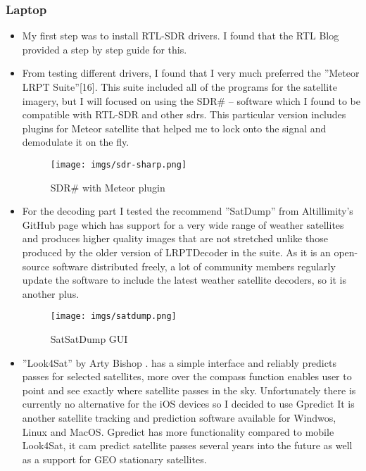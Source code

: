 \documentclass{article}
\begin{document}
        \subsubsection{Laptop}
            \begin{itemize}
                \item[] My first step was to install RTL-SDR drivers. I found that the RTL Blog provided a step by step guide for this\cite{15}.
                \item[] From testing different drivers, I found that I very much preferred the ”Meteor LRPT Suite”[16]. This suite included all of the programs for the satellite imagery, but I will focused on using the SDR\# – software which I found to be  compatible with RTL-SDR and other sdrs. This particular version includes plugins for Meteor satellite that helped me to lock onto the signal and demodulate it on the fly.
                
                \begin{figure}[H]
                    \centering
                    \texttt{[image: imgs/sdr-sharp.png]}
                    \caption{SDR\# with Meteor plugin}
                    \label{img:sdr-sharp}
                \end{figure}

                \item[] For the decoding part I tested the recommend ”SatDump” from Altillimity’s GitHub page\cite{17} which has support for a very wide range of weather satellites and produces higher quality images that are not stretched unlike those produced by the older version of LRPTDecoder in the suite. As it is an open-source software distributed freely, a lot of community members regularly update the software to include the latest weather satellite decoders, so it is another plus.
                
                \begin{figure}[H]
                    \centering
                    \texttt{[image: imgs/satdump.png]}
                    \caption{SatSatDump GUI \cite{satdump}}
                    \label{img:satdump}
                \end{figure}
                
                \item[] ”Look4Sat” by Arty Bishop \cite{18}. has a simple interface and reliably predicts passes for selected satellites, more over the compass function enables user to point and see exactly where satellite passes in the sky. Unfortunately there is currently no alternative for the iOS devices so I decided to use Gpredict\cite{19} It is another satellite tracking and prediction software available for Windwos, Linux and MacOS. Gpredict has more functionality compared to mobile Look4Sat, it cam predict satellite passes several years into the future as well as a support for GEO stationary satellites.
                

\end{itemize}
\end{document}
